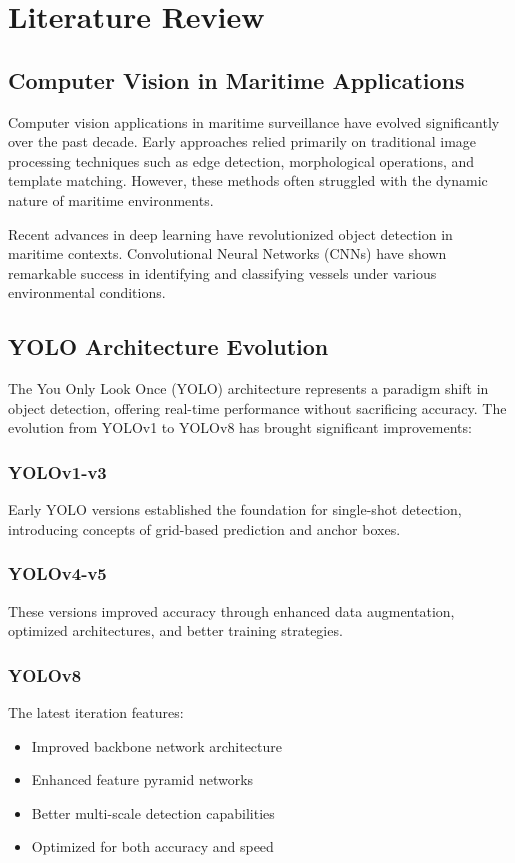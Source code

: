 \documentclass[12pt,a4paper]{report}
\begin{document}
\chapter{Literature Review}

\section{Computer Vision in Maritime Applications}
Computer vision applications in maritime surveillance have evolved significantly over the past decade. Early approaches relied primarily on traditional image processing techniques such as edge detection, morphological operations, and template matching. However, these methods often struggled with the dynamic nature of maritime environments.

Recent advances in deep learning have revolutionized object detection in maritime contexts. Convolutional Neural Networks (CNNs) have shown remarkable success in identifying and classifying vessels under various environmental conditions.

\section{YOLO Architecture Evolution}
The You Only Look Once (YOLO) architecture represents a paradigm shift in object detection, offering real-time performance without sacrificing accuracy. The evolution from YOLOv1 to YOLOv8 has brought significant improvements:

\subsection{YOLOv1-v3}
Early YOLO versions established the foundation for single-shot detection, introducing concepts of grid-based prediction and anchor boxes.

\subsection{YOLOv4-v5}
These versions improved accuracy through enhanced data augmentation, optimized architectures, and better training strategies.

\subsection{YOLOv8}
The latest iteration features:
\begin{itemize}
    \item Improved backbone network architecture
    \item Enhanced feature pyramid networks
    \item Better multi-scale detection capabilities
    \item Optimized for both accuracy and speed
\end{itemize}
\end{document}
